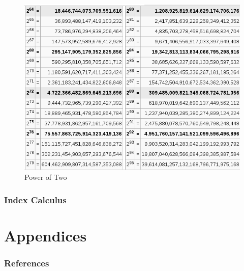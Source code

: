 \documentclass[hyperref=true]{beamer}
\begin{document}
\begin{frame}
  \begin{figure}
    \centering
    \includegraphics[scale=0.4]{PowOfTwo.png}
    \caption{Power of Two}
    \label{fig:attack-power-of-two}
  \end{figure}
\end{frame}

\begin{frame}
  \frametitle{Index Calculus}
\end{frame}






\section{Appendices}


\begin{frame}[allowframebreaks]
  \frametitle{References}



\end{frame}
\end{document}
